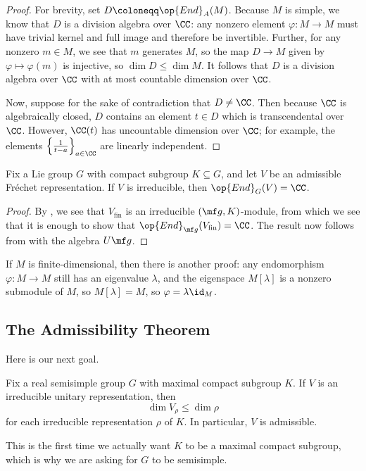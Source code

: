 \documentclass[../notes.tex]{subfiles}
\begin{document}
\begin{proof}
	For brevity, set $D\coloneqq\op{End}_A(M)$. Because $M$ is simple, we know that $D$ is a division algebra over $\CC$: any nonzero element $\varphi\colon M\to M$ must have trivial kernel and full image and therefore be invertible. Further, for any nonzero $m\in M$, we see that $m$ generates $M$, so the map $D\to M$ given by $\varphi\mapsto\varphi(m)$ is injective, so $\dim D\le\dim M$. It follows that $D$ is a division algebra over $\CC$ with at most countable dimension over $\CC$.

	Now, suppose for the sake of contradiction that $D\ne\CC$. Then because $\CC$ is algebraically closed, $D$ contains an element $t\in D$ which is transcendental over $\CC$. However, $\CC(t)$ has uncountable dimension over $\CC$; for example, the elements $\left\{\frac1{t-a}\right\}_{a\in\CC}$ are linearly independent.
\end{proof}
\begin{corollary}
	Fix a Lie group $G$ with compact subgroup $K\subseteq G$, and let $V$ be an admissible Fr\'echet representation. If $V$ is irreducible, then $\op{End}_G(V)=\CC$.
\end{corollary}
\begin{proof}
	By , we see that $V_{\mathrm{fin}}$ is an irreducible $(\mf g,K)$-module, from which we see that it is enough to show that $\op{End}_{\mf g}(V_{\mathrm{fin}})=\CC$. The result now follows from  with the algebra $U\mf g$.
\end{proof}
\begin{remark}
	If $M$ is finite-dimensional, then there is another proof: any endomorphism $\varphi\colon M\to M$ still has an eigenvalue $\lambda$, and the eigenspace $M[\lambda]$ is a nonzero submodule of $M$, so $M[\lambda]=M$, so $\varphi=\lambda\id_M$.
\end{remark}

\subsection{The Admissibility Theorem}
Here is our next goal.
\begin{theorem} \label{thm:hc-admissibility}
	Fix a real semisimple group $G$ with maximal compact subgroup $K$. If $V$ is an irreducible unitary representation, then
	\[\dim V_\rho\le\dim\rho\]
	for each irreducible representation $\rho$ of $K$. In particular, $V$ is admissible.
\end{theorem}
This is the first time we actually want $K$ to be a maximal compact subgroup, which is why we are asking for $G$ to be semisimple.
\end{document}
